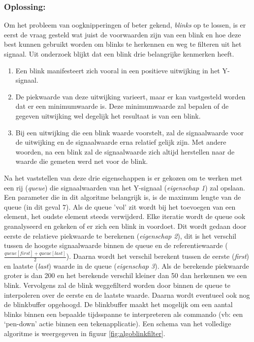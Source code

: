 \documentclass{article}
\begin{document}
\subsubsection{Oplossing:}
Om het probleem van oogknipperingen of beter gekend, \textit{blinks }op te lossen, is er eerst de vraag gesteld wat juist de voorwaarden zijn van een blink en hoe deze best kunnen gebruikt worden om blinks te herkennen en weg te filteren uit het signaal. Uit onderzoek \cite{Bulling:eyeanalysis} blijkt dat een blink drie belangrijke kenmerken heeft. 
\begin{enumerate}
	\item Een blink manifesteert zich vooral in een positieve uitwijking in het Y-signaal.
	\item De piekwaarde van deze uitwijking varieert, maar er kan vastgesteld worden dat er een minimumwaarde is. Deze minimumwaarde zal bepalen of de gegeven uitwijking wel degelijk het resultaat is van een blink.
	\item Bij een uitwijking die een blink waarde voorstelt, zal de signaalwaarde voor de uitwijking en de signaalwaarde erna relatief gelijk zijn. Met andere woorden, na een blink zal de signaalwaarde zich altijd herstellen naar de waarde die gemeten werd net voor de blink.
\end{enumerate}

Na het vaststellen van deze drie eigenschappen is er gekozen om te werken met een rij (\textit{queue}) die signaalwaarden van het Y-signaal (\textit{eigenschap 1}) zal opslaan. Een parameter die in dit algoritme belangrijk is, is de maximum lengte van de queue (in dit geval 7). Als de queue 'vol' zit wordt bij het toevoegen van een element, het oudste element steeds verwijderd. Elke iteratie wordt de queue ook geanalyseerd en gekeken of er zich een blink in voordoet. Dit wordt gedaan door eerste de relatieve piekwaarde te berekenen (\textit{eigenschap 2}), dit is het verschil tussen de hoogste signaalwaarde binnen de queue en de referentiewaarde ($\frac{queue[first] + queue[last]}{2}$). Daarna wordt het verschil berekent tussen de eerste (\textit{first}) en laatste (\textit{last}) waarde in de queue (\textit{eigenschap 3}). Als de berekende piekwaarde groter is
dan 200 en het berekende verschil kleiner dan 50 dan herkennen we een blink. Vervolgens zal de blink weggefilterd worden door binnen de queue te interpoleren over de eerste en de laatste waarde. Daarna wordt eventueel ook nog de blinkbuffer opgehoogd. De blinkbuffer maakt het mogelijk om een aantal blinks binnen een bepaalde tijdsspanne te interpreteren als commando (vb: een ‘pen-down’ actie binnen een tekenapplicatie). Een schema van het volledige algoritme is weergegeven in figuur \ref{fig:algoblinkfilter}.
\end{document}
